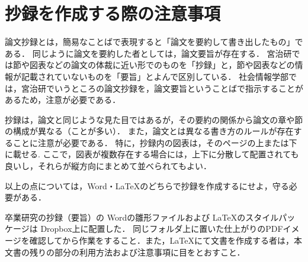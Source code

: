 \section{抄録を作成する際の注意事項}
論文抄録とは，簡易なことばで表現すると「論文を要約して書き出したもの」である．
同じように論文を要約した者としては，論文要旨が存在する．
宮治研では節や図表などの論文の体裁に近い形でのものを「抄録」と，節や図表などの情報が記載されていないものを「要旨」とよんで区別している．
社会情報学部では，宮治研でいうところの論文抄録を，論文要旨ということばで指示することがあるため，注意が必要である．

抄録は，論文と同じような見た目ではあるが，その要約の関係から論文の章や節の構成が異なる（ことが多い）．
また，論文とは異なる書き方のルールが存在することに注意が必要である．
特に，抄録内の図表は，そのページの上または下に載せる.
ここで，図表が複数存在する場合には，上下に分散して配置されても良いし，それらが縦方向にまとめて並べられてもよい．

以上の点については，Word・\LaTeX のどちらで抄録を作成するにせよ，守る必要がある．

卒業研究の抄録（要旨）の Wordの雛形ファイルおよび \LaTeX のスタイルパッケージは Dropbox上に配置した．
同じフォルダ上に置いた仕上がりのPDFイメージを確認してから作業をすること．また，\LaTeX にて文書を作成する者は，本文書の残りの部分の利用方法および注意事項に目をとおすこと．